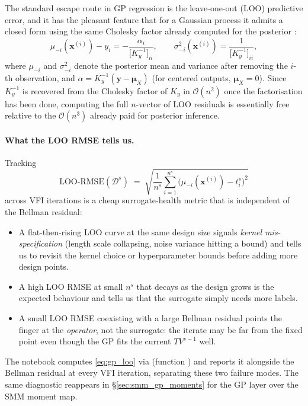 \documentclass[11pt,a4paper]{report}
\newcommand{\x}{\bm{x}}
\begin{document}
The standard escape route in GP regression is the leave-one-out (LOO) predictive error, and it has the pleasant feature that for a Gaussian process it admits a closed form using the same Cholesky factor already computed for the posterior \citep[\S 5.4.2]{Rasmussen:2005:GPM:1162254}:
\begin{equation}
\mu_{-i}(\x^{(i)}) - y_i = -\frac{\alpha_i}{\bigl[K_y^{-1}\bigr]_{ii}},
\qquad
\sigma_{-i}^2(\x^{(i)}) = \frac{1}{\bigl[K_y^{-1}\bigr]_{ii}},
\label{eq:gp_loo}
\end{equation}
where $\mu_{-i}$ and $\sigma_{-i}^2$ denote the posterior mean and variance after removing the $i$-th observation, and $\alpha = K_y^{-1}(\bm y-\bm\mu_X)$ (for centered outputs, $\bm\mu_X=0$).  Since $K_y^{-1}$ is recovered from the Cholesky factor of $K_y$ in $\mathcal{O}(n^2)$ once the factorisation has been done, computing the full $n$-vector of LOO residuals is essentially free relative to the $\mathcal{O}(n^3)$ already paid for posterior inference.

\paragraph{What the LOO RMSE tells us.}
Tracking
\[
\mathrm{LOO\text{-}RMSE}(\mathcal{D}^s) \;=\; \sqrt{\frac{1}{n^s}\sum_{i=1}^{n^s}\bigl(\mu_{-i}(\x^{(i)}) - t_i^s\bigr)^2}
\]
across VFI iterations is a cheap surrogate-health metric that is independent of the Bellman residual:
\begin{itemize}[itemsep=2pt]
\item A flat-then-rising LOO curve at the same design size signals \emph{kernel mis-specification} (length scale collapsing, noise variance hitting a bound) and tells us to revisit the kernel choice or hyperparameter bounds before adding more design points.
\item A high LOO RMSE at small $n^s$ that decays as the design grows is the expected behaviour and tells us that the surrogate simply needs more labels.
\item A small LOO RMSE coexisting with a large Bellman residual points the finger at the \emph{operator}, not the surrogate: the iterate may be far from the fixed point even though the GP fits the current $TV^{s-1}$ well.
\end{itemize}
The notebook  computes \eqref{eq:gp_loo} via  (function ) and reports it alongside the Bellman residual at every VFI iteration, separating these two failure modes.  The same diagnostic reappears in \S\ref{sec:smm_gp_moments} for the GP layer over the SMM moment map.
\end{document}
